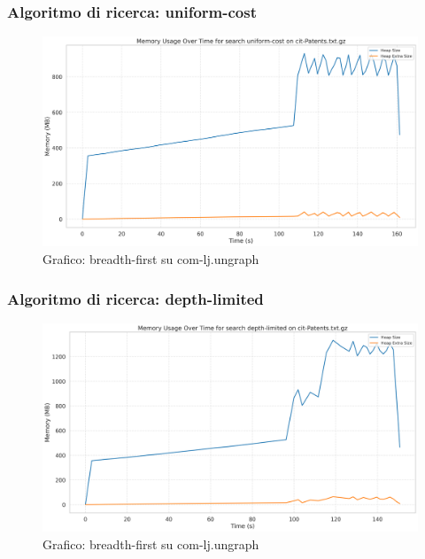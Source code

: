\documentclass{article}
\begin{document}
\subsubsection{Algoritmo di ricerca: uniform-cost}
\begin{figure}[htbp]\centering
\includegraphics[width=\textwidth]{../plots/cit-Patents_uniform-cost.png}
\caption{Grafico: breadth-first su com-lj.ungraph}
\end{figure}
\subsubsection{Algoritmo di ricerca: depth-limited}
\begin{figure}[htbp]\centering
\includegraphics[width=\textwidth]{../plots/cit-Patents_depth-limited.png}
\caption{Grafico: breadth-first su com-lj.ungraph}
\end{figure}
\end{document}
